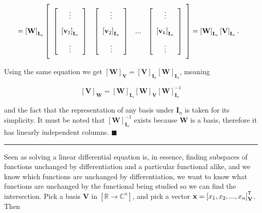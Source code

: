 \begin{align}
	&= \left[\mathbf{W}\right]_{\mathbf{I}_n} \left[\raisebox{15mm}{} \begin{array}{cccc} \left[\begin{array}{c} \vdots \\[3mm]  \left[\mathbf{v}_1\right]_{\mathbf{I}_n} \\[3mm] \vdots \end{array}\right] & \left[\begin{array}{c} \vdots \\[3mm] \left[\mathbf{v}_2\right]_{\mathbf{I}_n} \\[3mm] \vdots \end{array}\right] & ... & \left[\begin{array}{c} \vdots \\[3mm] \left[\mathbf{v}_k\right]_{\mathbf{I}_n} \\[3mm] \vdots \end{array}\right]\end{array}\right] = \left[\mathbf{W}\right]_{\mathbf{I}_n}\left[\mathbf{V}\right]_{\mathbf{I}_n} .
\end{align}

	Using the same equation we get $\left[\mathbf{W}\right]_{\mathbf{V}} = \left[\mathbf{V}\right]_{\mathbf{I}_n}\left[\mathbf{W}\right]_{\mathbf{I}_n}$, meaning

\begin{equation} \left[\mathbf{V}\right]_{\mathbf{W}} = \left[\mathbf{W}\right]_{\mathbf{I}_n}\left[\mathbf{W}\right]_{\mathbf{V}}\left[\mathbf{W}\right]_{\mathbf{I}_n}^{-1} \end{equation}

	\noindent and the fact that the representation of any basis under $\mathbf{I}_n$ is taken for its simplicity. It must be noted that $\left[\mathbf{W}\right]_{\mathbf{I}_n}^{-1}$ exists because $\mathbf{W}$ is a basis, therefore it has linearly independent columns.
\hfill$\blacksquare$
\vspace{5mm}
\hrule
\vspace{5mm} %


	Seen as solving a linear differential equation is, in essence, finding subspaces of functions unchanged by differentiation and a particular functional alike, and we know which functions are unchanged by differentiation, we want to know what functions are unchanged by the functional being studied so we can find the intersection. Pick a basis $\mathbf{V}$ in $\left[\mathbb{R}\to\mathbb{C}^n\right]$, and pick a vector $\mathbf{x} = \left[x_1,x_2,...,x_n\right]^{\mathsf{T}}_\mathbf{V}$. Then

